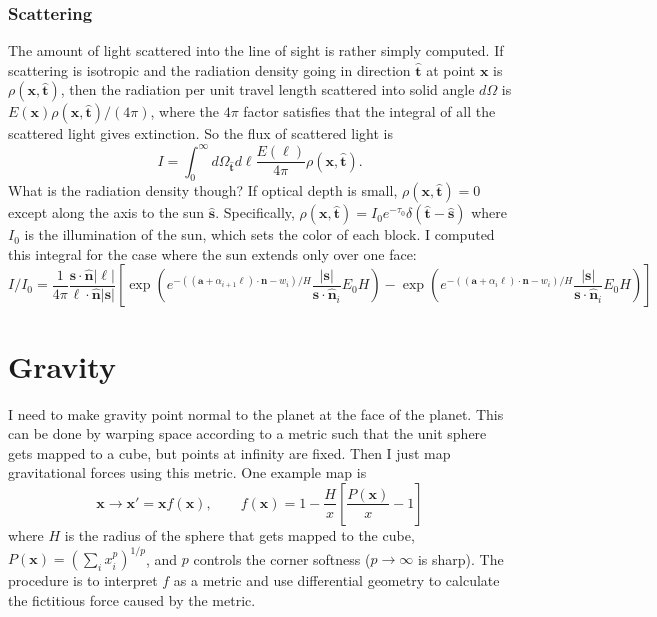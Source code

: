 \documentclass[11pt,twocolumn]{article}
\newcommand{\unit}[1]{\hat{\bm {#1}}}
\newcommand{\parens}[1]{\left(#1\right)}
\newcommand{\brackets}[1]{\left[#1\right]}
\begin{document}
    \subsubsection{Scattering}
      The amount of light scattered into the line of sight is rather simply computed. If scattering is isotropic and the radiation density going in direction $\unit t$ at point $\bm x$ is $\rho(\bm x,\unit t)$, then the radiation per unit travel length scattered into solid angle $d\Omega$ is $E(\bm x) \rho(\bm x, \unit t) / (4\pi)$, where the $4\pi$ factor satisfies that the integral of all the scattered light gives extinction. So the flux of scattered light is
      \begin{equation}
        I = \int_0^\infty d\Omega_{\unit t} d\ell \frac{E(\ell)}{4\pi} \rho(\bm x, \unit t).
      \end{equation}
      What is the radiation density though? If optical depth is small, $\rho(\bm x, \unit t)=0$ except along the axis to the sun $\unit s$. Specifically, $\rho(\bm x, \unit t) = I_0 e^{-\tau_0}\delta(\unit t - \unit s)$ where $I_0$ is the illumination of the sun, which sets the color of each block. I computed this integral for the case where the sun extends only over one face:
      \begin{equation}
        I/I_0 = \frac{1}{4\pi} \frac{\bm s \cdot \unit n |\bm \ell|}{\bm \ell \cdot \unit n |\bm s|} \brackets{
          \exp\parens{e^{-((\bm a + \alpha_{i+1} \bm \ell) \cdot \bm n-w_i)/H} \frac{|\bm s|}{\bm s\cdot \unit n_i}E_0 H}
          -\exp\parens{e^{-((\bm a + \alpha_i \bm \ell) \cdot \bm n-w_i)/H} \frac{|\bm s|}{\bm s\cdot \unit n_i}E_0 H}
        }
      \end{equation}


    \section{Gravity}

    I need to make gravity point normal to the planet at the face of the planet. This can be done by warping space according to a metric such that the unit sphere gets mapped to a cube, but points at infinity are fixed. Then I just map gravitational forces using this metric. One example map is
    \begin{equation}
      \bm x \rightarrow \bm x' = \bm x f(\bm x),\qquad f(\bm x) = 1 - \frac{H}{x} \brackets{\frac{P(\bm x)}{x} - 1}
    \end{equation}
    where $H$ is the radius of the sphere that gets mapped to the cube, $P(\bm x) = \parens{\sum_i x_i^p}^{1/p}$, and $p$ controls the corner softness ($p\rightarrow \infty$ is sharp). The procedure is to interpret $f$ as a metric and use differential geometry to calculate the fictitious force caused by the metric.
\end{document}
